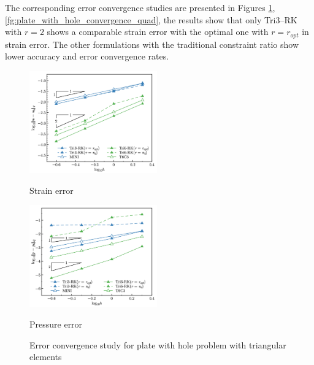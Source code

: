 The corresponding error convergence studies are presented in Figures \ref{fg:plate_with_hole_convergence}, \ref{fg:plate_with_hole_convergence_quad}, the results show that only Tri3--RK with $r=2$ shows a comparable strain error with the optimal one with $r=r_{opt}$ in strain error. The other formulations with the traditional constraint ratio show lower accuracy and error convergence rates.

\begin{figure}[!htp]
\centering
\begin{subcaptiongroup}
\centering
\parbox[b]{0.49\textwidth}{
    \includegraphics[width=0.49\textwidth]{png/plate_with_hole_Hdev_r1.png}
    \caption{Strain error}\label{fg:plate_with_hole_convergence_strain}
}
\parbox[b]{0.49\textwidth}{
    \includegraphics[width=0.49\textwidth]{png/plate_with_hole_L2_p_r1.png}
    \caption{Pressure error}\label{fg:plate_with_hole_convergence_pressure}
}
\end{subcaptiongroup}
\caption{Error convergence study for plate with hole problem with triangular elements}\label{fg:plate_with_hole_convergence}
\end{figure}

